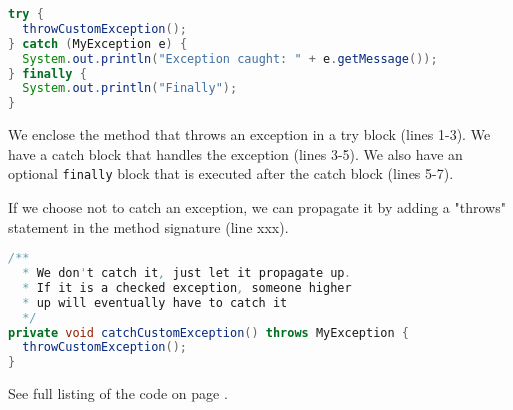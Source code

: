 \begin{lstlisting}[language=Java]
try {
  throwCustomException();
} catch (MyException e) {
  System.out.println("Exception caught: " + e.getMessage());
} finally {
  System.out.println("Finally");
}
\end{lstlisting}

We enclose the method that throws an exception in a try block (lines 1-3). We have a catch block that handles the exception (lines 3-5). We also have an optional \lstinline[columns=fixed]{finally} block that is executed after the catch block (lines 5-7).

If we choose not to catch an exception, we can propagate it by adding a "throws" statement in the method signature (line xxx).

\begin{lstlisting}[language=Java]
/**
  * We don't catch it, just let it propagate up.
  * If it is a checked exception, someone higher
  * up will eventually have to catch it
  */
private void catchCustomException() throws MyException {
  throwCustomException();
}
\end{lstlisting}

See full listing of the code on page \pageref{App:AppendixHThrowCatch}.